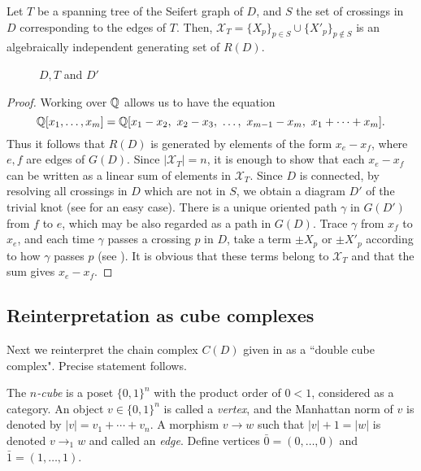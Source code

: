 \begin{lemma}\label{treebasislem}
    Let $T$ be a spanning tree of the Seifert graph of $D$, and $S$ the set of crossings in $D$ corresponding to the edges of $T$.
    Then, $\mathcal{X}_T = \{X_p\}_{p \in S} \cup \{X'_p\}_{p \notin S}$ is an algebraically independent generating set of $R(D)$.
\end{lemma}

\begin{figure}
    \centering
    
    \caption{$D, T$ and $D'$}
    \label{fig:treebasislem}
\end{figure}

\begin{proof}
    Working over $\mathbb{Q}$ allows us to have the equation
    \[
    \QQ[x_1, \ldots , x_m] = \QQ[x_1-x_2,\ x_2-x_3,\ \ldots,\ x_{m-1}-x_m,\ x_1+\cdots+x_m].
    \]
    Thus it follows that $R(D)$ is generated by elements of the form $x_e - x_f$, where $e, f$ are edges of $G(D)$.
    Since $|\mathcal{X}_T| = n$, it is enough to show that each $x_e - x_f$ can be written as a linear sum of elements in $\mathcal{X}_T$.
    Since $D$ is connected, by resolving all crossings in $D$ which are not in $S$, we obtain a diagram $D'$ of the trivial knot (see  for an easy case).
    There is a unique oriented path $\gamma$ in $G(D')$ from $f$ to $e$, which may be also regarded as a path in $G(D)$.
    Trace $\gamma$ from $x_f$ to $x_e$, and each time $\gamma$ passes a crossing $p$ in $D$, take a term $\pm X_p$ or $\pm X'_p$ according to how $\gamma$ passes $p$ (see ).
    It is obvious that these terms belong to $\mathcal{X}_T$ and that the sum gives $x_e-x_f$.
\end{proof}

\subsection{Reinterpretation as cube complexes} \label{subsec:double-cube-cpx}

Next we reinterpret the chain complex $C(D)$ given in  as a ``double cube complex". Precise statement follows.

The \textit{$n$-cube} is a poset $\{0, 1\}^n$ with the product order of $0 < 1$, considered as a category.
An object $v \in \{0, 1\}^n$ is called a \textit{vertex}, and the Manhattan norm of $v$ is denoted by $|v| = v_1 + \cdots + v_n$. A morphism $v \to w$ such that $|v| + 1 = |w|$ is denoted $v \to_1 w$ and called an \textit{edge}. Define vertices $\bar{0} = (0, \ldots, 0)$ and $\bar{1} = (1, \ldots, 1)$.

